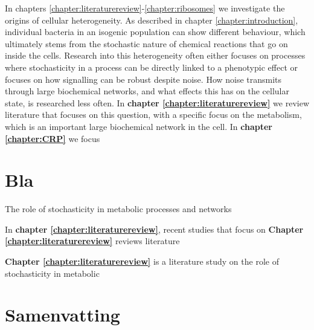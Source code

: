 In chapters \ref{chapter:literaturereview}-\ref{chapter:ribosomes} we investigate the origins of cellular heterogeneity.
%
As described in chapter \ref{chapter:introduction}, 
individual bacteria in an isogenic population can show different behaviour,
which ultimately stems from the stochastic nature of 
chemical reactions that go on inside the cells.
%
Research into this heterogeneity often either focuses on processes where stochasticity in a process can be directly linked to a phenotypic effect
or focuses on how signalling can be robust despite noise.
%
How noise transmits through large biochemical networks, and what effects this has on the cellular state, is researched less often.
%
In
\textbf{chapter \ref{chapter:literaturereview}} we review literature that focuses on this question,
with a specific focus on the metabolism, which is an important large biochemical network in the cell.
%
In \textbf{chapter \ref{chapter:CRP}} we focus 


\chapter*{Bla}


The role of stochasticity in metabolic processes and networks 

In \textbf{chapter \ref{chapter:literaturereview}}, recent studies that focus on 
\textbf{Chapter \ref{chapter:literaturereview}} reviews literature 




\textbf{Chapter \ref{chapter:literaturereview}} is a literature study on the role of stochasticity in metabolic 

 





\chapter*{Samenvatting}